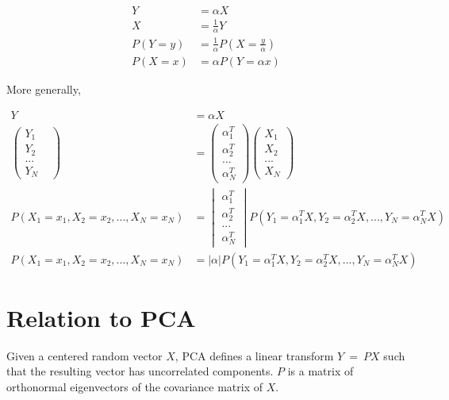 \documentclass[11pt, a4paper]{article}
\begin{document}
\begin{align*}
	Y      & = \alpha X                               \\
	X      & = \frac{1}{\alpha} Y                     \\
	P(Y=y) & = \frac{1}{\alpha} P(X=\frac{y}{\alpha}) \\
	P(X=x) & = \alpha P(Y=\alpha x)                   
\end{align*}

More generally,

\begin{align*}
	Y                                 & = \alpha X                                                                \\
	\begin{pmatrix} Y_1               &                                                                           \\ Y_2 \\ ... \\Y_N \end{pmatrix} &= \begin{pmatrix} \alpha_1^T \\ \alpha_2^T \\ ... \\  \alpha_N^T \end{pmatrix} \begin{pmatrix} X_1 \\ X_2 \\... \\  X_N \end{pmatrix}  \\
	P(X_1=x_1, X_2=x_2, ..., X_N=x_N) & =  \begin{vmatrix} \alpha_1^T                                             \\ \alpha_2^T \\ ... \\  \alpha_N^T \end{vmatrix}  P(Y_1=\alpha_1^T X, Y_2=\alpha_2^T X, ..., Y_N=\alpha_N^T X) \\
	P(X_1=x_1, X_2=x_2, ..., X_N=x_N) & =  |\alpha|  P(Y_1=\alpha_1^T X, Y_2=\alpha_2^T X, ..., Y_N=\alpha_N^T X) 
\end{align*}

\section{Relation to PCA}

Given a centered random vector $X$, PCA defines a linear transform $Y\ =\ P X$ such that the resulting vector has uncorrelated components. $P$ is a matrix of orthonormal eigenvectors of the covariance matrix of $X$.
\end{document}
